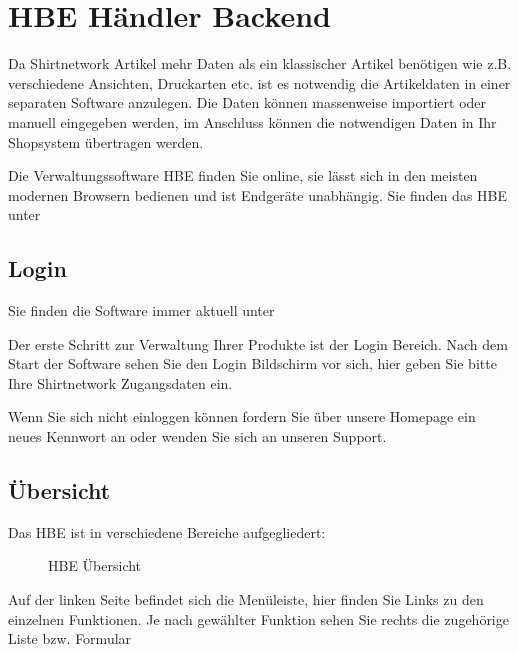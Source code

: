 \documentclass[letterpaper,10pt,ngerman]{sphinxmanual}
\begin{document}
\chapter{HBE \sphinxhyphen{} Händler Backend}
\label{\detokenize{hbe/index:hbe-handler-backend}}\label{\detokenize{hbe/index::doc}}
Da Shirtnetwork Artikel mehr Daten als ein klassischer Artikel benötigen wie z.B. verschiedene Ansichten, Druckarten etc.
ist es notwendig die Artikeldaten in einer separaten Software anzulegen. Die Daten können massenweise importiert
oder manuell eingegeben werden, im Anschluss können die notwendigen Daten in Ihr Shopsystem übertragen werden.

Die Verwaltungssoftware HBE finden Sie online, sie lässt sich in den meisten modernen Browsern bedienen und ist Endgeräte unabhängig.
Sie finden das HBE unter 


\section{Login}
\label{\detokenize{hbe/login:login}}\label{\detokenize{hbe/login::doc}}
Sie finden die Software immer aktuell unter 

Der erste Schritt zur Verwaltung Ihrer Produkte ist der Login Bereich. Nach dem Start der Software sehen Sie den Login
Bildschirm vor sich, hier geben Sie bitte Ihre Shirtnetwork Zugangsdaten ein.

Wenn Sie sich nicht einloggen können fordern Sie über unsere Homepage ein neues Kennwort an oder
wenden Sie sich an unseren Support.


\section{Übersicht}
\label{\detokenize{hbe/intro:ubersicht}}\label{\detokenize{hbe/intro::doc}}
Das HBE ist in verschiedene Bereiche aufgegliedert:

\begin{figure}[htbp]
\centering
\capstart

\noindent{}
\caption{HBE Übersicht}\label{\detokenize{hbe/intro:id1}}\end{figure}

Auf der linken Seite befindet sich die Menüleiste, hier finden Sie Links zu den einzelnen Funktionen.
Je nach gewählter Funktion sehen Sie rechts die zugehörige Liste bzw. Formular
\end{document}
